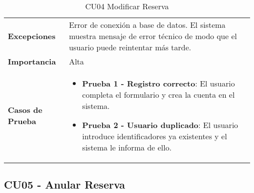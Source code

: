 \begin{table}[H]
\begin{tabularx}{\linewidth}{ p{} p{} }
		\textbf{Excepciones}          &  Error de conexión a base de datos. El sistema muestra mensaje de error técnico de modo que el usuario puede reintentar más tarde.\\
		\textbf{Importancia}          & Alta \\
		\textbf{Casos de Prueba}      &
		\begin{itemize}
			\item \textbf{Prueba 1 - Registro correcto}: El usuario completa el formulario y crea la cuenta en el sistema.
			\item \textbf{Prueba 2 - Usuario duplicado}: El usuario introduce identificadores ya existentes y el sistema le informa de ello.
		\end{itemize} \\
		\bottomrule
	\end{tabularx}
	\caption{CU04 Modificar Reserva}
	\label{cu:modificar-reserva}
\end{table}

\subsection{CU05 - Anular Reserva}

